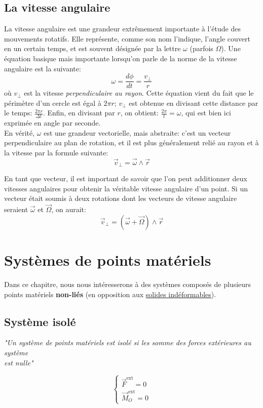 \documentclass{article}
\numberwithin{equation}{section}
\begin{document}
\subsection{La vitesse angulaire}
La vitesse angulaire est une grandeur extrêmement importante à l'étude des mouvements rotatifs. Elle représente, comme son nom l'indique, l'angle couvert en un certain temps, et est souvent désignée par la lettre \(\omega\) (parfois \(\Omega\)). Une équation basique mais importante lorsqu'on parle de la norme de la vitesse angulaire est la suivante:
\begin{equation}
	\boxed{ \omega = \frac{d\phi}{dt} = \dfrac{v_\perp}{r} }
\end{equation}
où \(v_\perp\) est la vitesse \emph{perpendiculaire au rayon}. Cette équation vient du fait que le périmètre d'un cercle est égal à \(2 \pi r\); \(v_\perp\) est obtenue en divisant cette distance par le temps: \(\frac{2 \pi r}{\Delta t}\). Enfin, en divisant par \(r\), on obtient: \(\frac{2 \pi}{t} = \omega\), qui est bien ici exprimée en angle par seconde. \\

En vérité, \(\omega\) est une grandeur vectorielle, mais abstraite: c'est un vecteur perpendiculaire au plan de rotation, et il est plus généralement relié au rayon et à la vitesse par la formule suivante:
\begin{equation}
	\boxed{ \vec v_\perp = \vec \omega \wedge \vec r }
\end{equation}

En tant que vecteur, il est important de savoir que l'on peut additionner deux vitesses angulaires pour obtenir la véritable vitesse angulaire d'un point. Si un vecteur était soumis à deux rotations dont les vecteurs de vitesse angulaire seraient \(\vec \omega\) et \(\vec \Omega\), on aurait:
\begin{equation}
	\vec v_\perp = (\vec \omega + \vec \Omega) \wedge \vec r
\end{equation}


\section{Systèmes de points matériels}
Dans ce chapitre, nous nous intéresserons à des systèmes composés de plusieurs points matériels \textbf{non-liés} (en opposition aux \hyperref[sec:solideindeformable]{solides indéformables}).

\subsection{Système isolé}
\begin{center}
	\emph{"Un système de points matériels est isolé si les somme des forces extérieures au système \\ est nulle"}
\end{center}
\begin{equation*}
	\boxed{ \begin{cases} 
		\vec F^{\text{ext}} = 0 \\
		\vec M_O^{\text{ext}} = 0 
	\end{cases} }
\end{equation*}
\end{document}
